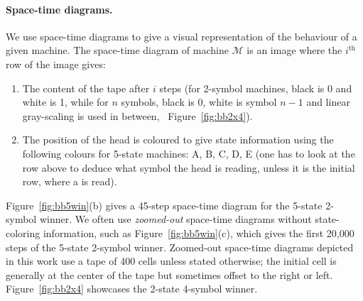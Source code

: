 \paragraph*{Space-time diagrams.} We use space-time diagrams to give a visual representation of the behaviour of a given machine. The space-time diagram of machine $\mathcal{M}$ is an image where the $i^\text{th}$ row of the image gives:
\begin{enumerate}
    \item The content of the tape after $i$ steps (for 2-symbol machines, black is 0 and white is 1, while for $n$ symbols, black is 0, white is symbol $n-1$ and linear gray-scaling is used in between, \eg~Figure~\ref{fig:bb2x4}).
    \item The position of the head is coloured to give state information using the following colours for 5-state machines: \textcolor{colorA}{A},  \textcolor{colorB}{B},  \textcolor{colorC}{C},  \textcolor{colorD}{D},  \textcolor{colorE}{E} (one has to look at the row above to deduce what symbol the head is reading, unless it is the initial row, where a \szero is read).
\end{enumerate}

Figure~\ref{fig:bb5win}(b) gives a 45-step space-time diagram for the 5-state 2-symbol \BBfull winner. We often use \textit{zoomed-out} space-time diagrams without state-coloring information, such as Figure~\ref{fig:bb5win}(c), which gives the first 20,000 steps of the 5-state 2-symbol \BBfull winner. Zoomed-out space-time diagrams depicted in this work use a tape of 400 cells unless stated otherwise; the initial cell is generally at the center of the tape but sometimes offset to the right or left. Figure~\ref{fig:bb2x4} showcases the 2-state 4-symbol \BBfull winner.


